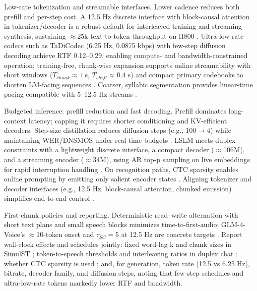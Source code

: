 \documentclass{article}
\begin{document}
Low-rate tokenization and streamable interfaces. Lower cadence reduces both prefill and per-step cost. A 12.5 Hz discrete interface with block-causal attention in tokenizer/decoder is a robust default for interleaved training and streaming synthesis, sustaining $\approx$25k text-to-token throughput on H800 \cite{zeng2024scalingspeechtextpretrainingsyntheticint}. Ultra-low-rate codecs such as TaDiCodec (6.25 Hz, 0.0875 kbps) with few-step diffusion decoding achieve RTF 0.12--0.29, enabling compute- and bandwidth-constrained operation; training-free, chunk-wise expansion supports online streamability with short windows ($T_{chunk} \approx 1$ s, $T_{shift} \approx 0.4$ s) and compact primary codebooks to shorten LM-facing sequences \cite{wang2025tadicodectextawarediffusionspeechtokeniz,kando2025exploringeffectsegmentationvocabularysiz}. Coarser, syllabic segmentation provides linear-time pacing compatible with 5--12.5 Hz streams \cite{cho2025sylbersyllabicembeddingrepresentationspe}.

Budgeted inference: prefill reduction and fast decoding. Prefill dominates long-context latency; capping it requires shorter conditioning and KV-efficient decoders. Step-size distillation reduces diffusion steps (e.g., 100$\rightarrow$4) while maintaining WER/DNSMOS under real-time budgets \cite{yang2025diffsoundstreamefficientspeechtokenizati}. LSLM meets duplex constraints with a lightweight discrete interface, a compact decoder ($\approx$106M), and a streaming encoder ($\approx$34M), using AR top-p sampling on live embeddings for rapid interruption handling \cite{ma2024languagemodelcanlistenwhilespeaking}. On recognition paths, CTC sparsity enables online prompting by emitting only salient encoder states \cite{tsunoo2024decoderonlyarchitecturespeechrecognition}. Aligning tokenizer and decoder interfaces (e.g., 12.5 Hz, block-causal attention, chunked emission) simplifies end-to-end control \cite{zeng2024scalingspeechtextpretrainingsyntheticint}.

First-chunk policies and reporting. Deterministic read--write alternation with short text plans and small speech blocks minimizes time-to-first-audio; GLM-4-Voice's $\approx$10-token onset and $\tau_{SC}=5$ at 12.5 Hz are concrete targets \cite{zeng2024glm4voicetowardsintelligenthumanlikeends,cui2025thinkbeforeyoutalkenhancingmeaningfuldia}. Report wall-clock effects and schedules jointly: fixed word-lag k and chunk sizes in SimulST \cite{guo2025streamuniachievingstreamingspeechtransla}; token-to-speech thresholds and interleaving ratios in duplex chat \cite{zeng2024glm4voicetowardsintelligenthumanlikeends}; whether CTC sparsity is used \cite{tsunoo2024decoderonlyarchitecturespeechrecognition}; and, for generation, token rate (12.5 vs 6.25 Hz), bitrate, decoder family, and diffusion steps, noting that few-step schedules and ultra-low-rate tokens markedly lower RTF and bandwidth.
\end{document}
